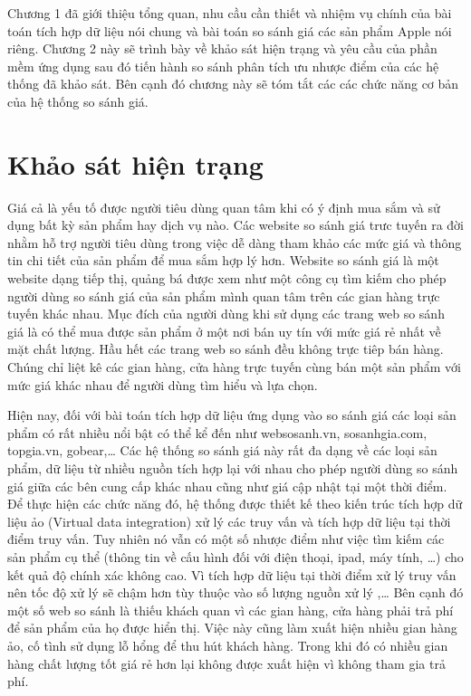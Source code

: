 \documentclass[../DoAn.tex]{subfiles}
\begin{document}
Chương 1 đã giới thiệu tổng quan, nhu cầu cần thiết và nhiệm vụ chính của bài toán tích hợp dữ liệu nói chung và bài toán so sánh giá các sản phẩm Apple nói riêng. Chương 2 này sẽ trình bày về khảo sát hiện trạng và yêu cầu của phần mềm ứng dụng sau đó tiến hành so sánh phân tích ưu nhược điểm của các hệ thống đã khảo sát. Bên cạnh đó chương này sẽ tóm tắt các các chức năng cơ bản của hệ thống so sánh giá.

\section{Khảo sát hiện trạng}
\label{section:2.1}
Giá cả là yếu tố được người tiêu dùng quan tâm khi có ý định mua sắm và sử dụng bất kỳ sản phẩm hay dịch vụ nào. Các website so sánh giá trưc tuyến ra đời nhằm hỗ trợ người tiêu dùng trong việc dễ dàng tham khảo các mức giá và thông tin chi tiết của sản phẩm để mua sắm hợp lý hơn. Website so sánh giá là một website dạng tiếp thị, quảng bá được xem như một công cụ tìm kiếm cho phép người dùng so sánh giá của sản phẩm mình quan tâm trên các gian hàng trực tuyến khác nhau. Mục đích của người dùng khi sử dụng các trang web so sánh giá  là có thể mua được sản phẩm ở một nơi bán uy tín với mức giá rẻ nhất về mặt chất lượng. Hầu hết các trang web so sánh đều không trực tiêp bán hàng. Chúng chỉ liệt kê các gian hàng, cửa hàng trực tuyến cùng bán một sản phẩm với mức giá khác nhau để người dùng tìm hiểu và lựa chọn.

Hiện nay, đối với bài toán tích hợp dữ liệu ứng dụng vào so sánh giá các loại sản phẩm có rất nhiều nổi bật có thể kể đến như websosanh.vn, sosanhgia.com, topgia.vn, gobear,… Các hệ thống so sánh giá này rất đa dạng về các loại sản phẩm, dữ liệu từ nhiều nguồn tích hợp lại với nhau cho phép người dùng so sánh giá giữa các bên cung cấp khác nhau cũng như giá cập nhật tại một thời điểm. Để thực hiện các chức năng đó, hệ thống được thiết kế theo kiến trúc tích hợp dữ liệu ảo (Virtual data integration) xử lý các truy vấn và tích hợp dữ liệu tại thời điểm truy vấn. Tuy nhiên nó vẫn có một số nhược điểm như việc tìm kiếm các sản phẩm cụ thể (thông tin về cấu hình đối với điện thoại, ipad, máy tính, …) cho kết quả độ chính xác không cao. Vì tích hợp dữ liệu tại thời điểm xử lý truy vấn nên tốc độ xử lý sẽ chậm hơn tùy thuộc vào số lượng nguồn xử lý ,… Bên cạnh đó một số web so sánh là thiếu khách quan vì các gian hàng, cửa hàng phải trả phí để sản phẩm của họ được hiển thị. Việc này cũng làm xuất hiện nhiều gian hàng ảo, cố tình sử dụng lỗ hổng để thu hút khách hàng. Trong khi đó có nhiều gian hàng chất lượng tốt giá rẻ hơn lại không được xuất hiện vì không tham gia trả phí.
\end{document}
